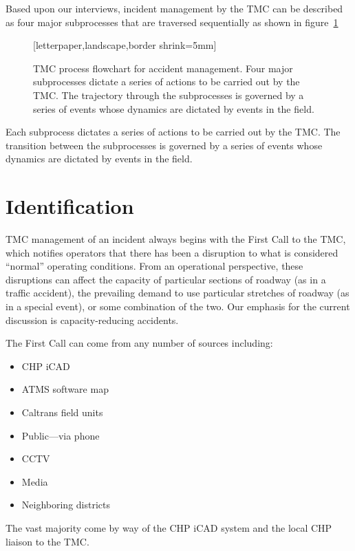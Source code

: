 \documentclass[12pt]{report}
\begin{document}
Based upon our interviews, incident management by the \ac{TMC} can be described
as four major subprocesses that are traversed sequentially as shown in
figure~\ref{fig:flowchart}
\begin{figure}
  [letterpaper,landscape,border shrink=5mm]
  \centering
  
  \caption[TMC process flowchart for accident management]{TMC process
    flowchart for accident management.  Four major subprocesses
    dictate a series of actions to be carried out by the TMC.  The
    trajectory through the subprocesses is governed by a series of
    events whose dynamics are dictated by events in the field.}
  \label{fig:flowchart}
\end{figure}
Each subprocess dictates a series of actions to be carried out by the \ac{TMC}.
The transition between the subprocesses is governed by a series of events whose
dynamics are dictated by events in the field.

\section{Identification}
\label{sec:identification}


\ac{TMC} management of an incident always begins with the {\sc First Call} to
the \ac{TMC}, which notifies operators that there has been a disruption to what
is considered ``normal'' operating conditions.  From an operational perspective,
these disruptions can affect the capacity of particular sections of roadway (as
in a traffic accident), the prevailing demand to use particular stretches of
roadway (as in a special event), or some combination of the two.  Our emphasis
for the current discussion is capacity-reducing accidents.

The {\sc First Call} can come from any number of sources including:
\begin{itemize}
\item \ac{CHP} \ac{iCAD}
\item \ac{ATMS} software map
\item Caltrans field units
\item Public---via phone
\item CCTV
\item Media
\item Neighboring districts
\end{itemize}
The vast majority come by way of the \ac{CHP} \ac{iCAD} system and the local
\ac{CHP} liaison to the \ac{TMC}.
\end{document}
